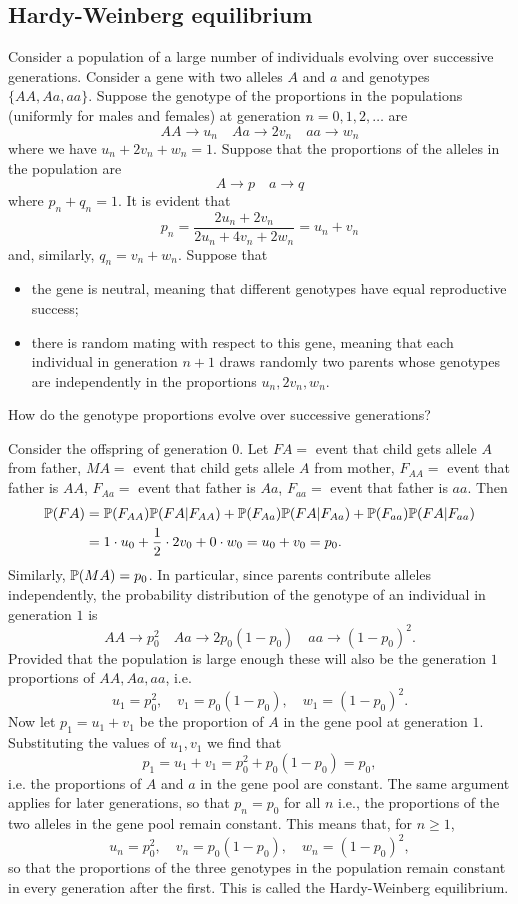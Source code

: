 \documentclass[10pt, a4paper]{article}
\begin{document}
\subsection{Hardy-Weinberg equilibrium}
Consider a population of a large number of individuals evolving over successive generations.
Consider a gene with two alleles $A$ and $a$ and genotypes $\{AA, Aa, aa\}$.
Suppose the genotype of the proportions in the populations (uniformly for males and females) at generation $n = 0, 1, 2, \dotsc$ are
\[
AA \rightarrow u_n\quad Aa \rightarrow 2v_n\quad aa \rightarrow w_n
\]
where we have $u_n + 2v_n + w_n = 1$.
Suppose that the proportions of the alleles in the population are
\[
A \rightarrow p\quad a \rightarrow q
\]
where $p_n + q_n = 1$.
It is evident that
\[
p_n = \frac{2u_n + 2v_n}{2u_n + 4v_n + 2w_n} = u_n + v_n
\]
and, similarly, $q_n = v_n + w_n$.
Suppose that
\begin{itemize}
    \item the gene is neutral, meaning that different genotypes have equal reproductive success;
    \item there is random mating with respect to this gene,
    meaning that each individual in generation $n + 1$ draws randomly two parents whose genotypes are independently in the proportions $u_n, 2v_n, w_n$.
\end{itemize}
How do the genotype proportions evolve over successive generations?

Consider the offspring of generation $0$.
Let $FA = $ event that child gets allele $A$ from father,
$MA = $ event that child gets allele $A$ from mother,
$F_{AA} = $ event that father is $AA$,
$F_{Aa} = $ event that father is $Aa$,
$F_{aa} = $ event that father is $aa$. Then
\begin{align*}
    \P(FA) &= \P(F_{AA})\P(FA | F_{AA}) + \P(F_{Aa})\P(FA | F_{Aa}) + \P(F_{aa})\P(FA | F_{aa}) \\
    &= 1 \cdot u_0 + \frac{1}{2} \cdot 2v_0 + 0 \cdot w_0 = u_0 + v_0 = p_0.
\end{align*}
Similarly, $\P(MA) = p_0$.
In particular, since parents contribute alleles independently,
the probability distribution of the genotype of an individual in generation $1$ is
\[
AA \rightarrow p_0 ^ 2\quad Aa \rightarrow 2p_0(1 - p_0)\quad aa \rightarrow (1 - p_0) ^ 2.
\]
Provided that the population is large enough these will also be the generation $1$ proportions of $AA, Aa, aa$, i.e.
\[
u_1 = p_0 ^ 2,\quad v_1 = p_0(1 - p_0),\quad w_1 = (1 - p_0) ^ 2.
\]
Now let $p_1 = u_1 + v_1$ be the proportion of $A$ in the gene pool at generation $1$.
Substituting the values of $u_1, v_1$ we find that
\[
p_1 = u_1 + v_1 = p_0 ^ 2 + p_0(1 - p_0) = p_0,
\]
i.e. the proportions of $A$ and $a$ in the gene pool are constant.
The same argument applies for later generations,
so that $p_n = p_0$ for all $n$ i.e.,
the proportions of the two alleles in the gene pool remain constant.
This means that, for $n \geq 1$,
\[
u_n = p_0 ^ 2,\quad v_n = p_0(1 - p_0),\quad w_n = (1 - p_0) ^ 2,
\]
so that the proportions of the three genotypes in the population remain constant in every generation after the first.
This is called the Hardy-Weinberg equilibrium.
\end{document}
